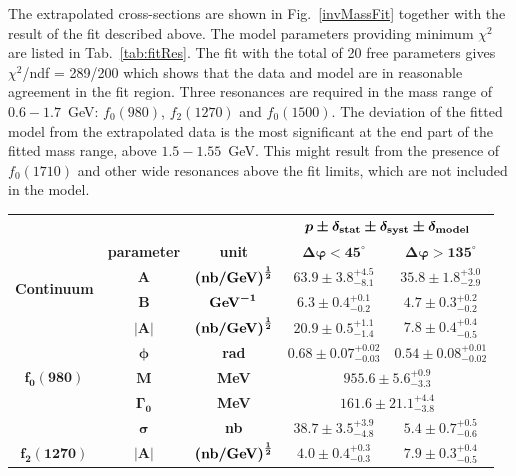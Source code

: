 The extrapolated cross-sections are shown in Fig.~\ref{invMassFit} together with the result of the fit described above. The model parameters providing minimum $\chi^{2}$ are listed in Tab.~\ref{tab:fitRes}. The fit with the total of 20 free parameters gives $\chi^2$/ndf = 289/200 which shows that the data and model are in reasonable agreement in the fit region. Three resonances are required in the mass range of $0.6-1.7$~GeV: $f_0(980)$, $f_2(1270)$ and $f_0(1500)$. The deviation of the fitted model from the extrapolated data is the most significant at the end part of the fitted mass range, above $1.5-1.55$~GeV. This might result from the presence of $f_{0}(1710)$ and other wide resonances above the fit limits, which are not included in the model.

{
\renewcommand{\arraystretch}{1.5}
\begin{table}[]\centering
\begin{tabular}{ccc c c} ~ & ~ & ~ &\multicolumn{2}{c}{$\bm{ p \pm \delta_{\text{\bf{stat}}} \pm \delta_{\text{\bf{syst}}} \pm \delta_{\text{\bf{model}}}}$} \\ ~ & \bf{parameter} & \bf{unit} & $\bm{\Delta\varphi<45^{\circ}}$ & $\bm{\Delta\varphi>135^{\circ}}$ \\ \hline\hline \multirow{2}{*}{\bf{Continuum}} & $\bm{A}$ & $\bm{\left(\text{\bf{nb/GeV}}\right)^{\frac{1}{2}}}$ & $63.9 \pm 3.8 ^{+4.5}_{-8.1}$ & $35.8 \pm 1.8 ^{+3.0}_{-2.9}$ \\ %
& $\bm{B}$ & $\bm{\text{\bf{GeV}}^{-1}}$ & $6.3 \pm 0.4 ^{+0.1}_{-0.2}$ & $4.7 \pm 0.3 ^{+0.2}_{-0.2}$ \\ \hline
\multirow{5}{*}{$\bm{f_{0}(980)}$} & $\bm{|A|}$ & $\bm{\left(\text{\bf{nb/GeV}}\right)^{\frac{1}{2}}}$ & $20.9 \pm 0.5 ^{+1.1}_{-1.4}$ & $7.8 \pm 0.4 ^{+0.4}_{-0.5}$ \\ %
& $\bm{\phi}$ & \bf{rad} & $0.68 \pm 0.07 ^{+0.02}_{-0.03}$ & $0.54 \pm 0.08 ^{+0.01}_{-0.02}$ \\ %
& $\bm{M}$ & \bf{MeV} & \multicolumn{2}{c}{$955.6 \pm 5.6 ^{+0.9}_{-3.3}$} \\ %
& $\bm{\Gamma_{0}}$ & \bf{MeV} & \multicolumn{2}{c}{$161.6 \pm 21.1 ^{+4.4}_{-3.8}$} \\ %
& $\bm{\sigma}$ & \bf{nb} & $38.7 \pm 3.5 ^{+3.9}_{-4.8}$ & $5.4 \pm 0.7 ^{+0.5}_{-0.6}$ \\ \hline
\multirow{3}{*}{$\bm{f_{2}(1270)}$} & $\bm{|A|}$ & $\bm{\left(\text{\bf{nb/GeV}}\right)^{\frac{1}{2}}}$ & $4.0 \pm 0.4 ^{+0.3}_{-0.3}$ & $7.9 \pm 0.3 ^{+0.4}_{-0.5}$ \\ %

\end{tabular}
\end{table}}

